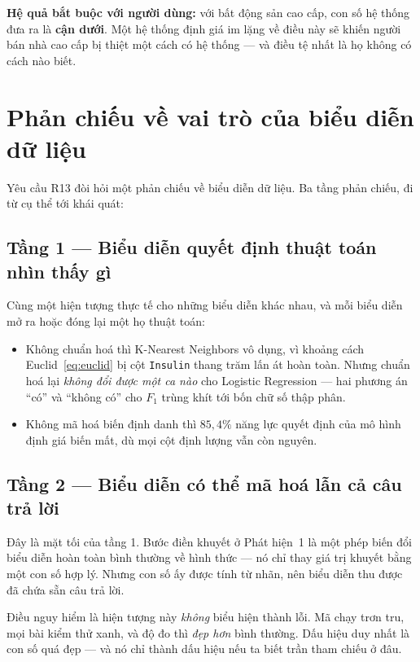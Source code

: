 \textbf{Hệ quả bắt buộc với người dùng:} với bất động sản cao cấp, con số hệ
thống đưa ra là \textbf{cận dưới}. Một hệ thống định giá im lặng về điều này sẽ
khiến người bán nhà cao cấp bị thiệt một cách có hệ thống --- và điều tệ nhất là
họ không có cách nào biết.

\section{Phản chiếu về vai trò của biểu diễn dữ liệu}
\label{sec:phanchieu-tong}

Yêu cầu R13 đòi hỏi một phản chiếu về biểu diễn dữ liệu. Ba tầng phản chiếu, đi
từ cụ thể tới khái quát:

\subsection{Tầng 1 --- Biểu diễn quyết định thuật toán nhìn thấy gì}

Cùng một hiện tượng thực tế cho những biểu diễn khác nhau, và mỗi biểu diễn mở
ra hoặc đóng lại một họ thuật toán:

\begin{itemize}
  \item Không chuẩn hoá thì K-Nearest Neighbors vô dụng, vì khoảng cách
        Euclid~\eqref{eq:euclid} bị cột \texttt{Insulin} thang trăm lấn át hoàn
        toàn. Nhưng chuẩn hoá lại \emph{không đổi được một ca nào} cho Logistic
        Regression --- hai phương án ``có'' và ``không có'' cho $F_1$ trùng khít
        tới bốn chữ số thập phân.
  \item Không mã hoá biến định danh thì $85{,}4\%$ năng lực quyết định của mô
        hình định giá biến mất, dù mọi cột định lượng vẫn còn nguyên.
\end{itemize}

\subsection{Tầng 2 --- Biểu diễn có thể mã hoá lẫn cả câu trả lời}

Đây là mặt tối của tầng 1. Bước điền khuyết ở Phát hiện~1 là một phép biến đổi
biểu diễn hoàn toàn bình thường về hình thức --- nó chỉ thay giá trị khuyết bằng
một con số hợp lý. Nhưng con số ấy được tính từ nhãn, nên biểu diễn thu được đã
chứa sẵn câu trả lời.

Điều nguy hiểm là hiện tượng này \emph{không} biểu hiện thành lỗi. Mã chạy trơn
tru, mọi bài kiểm thử xanh, và độ đo thì \emph{đẹp hơn} bình thường. Dấu hiệu
duy nhất là con số quá đẹp --- và nó chỉ thành dấu hiệu nếu ta biết trần tham
chiếu ở đâu.

